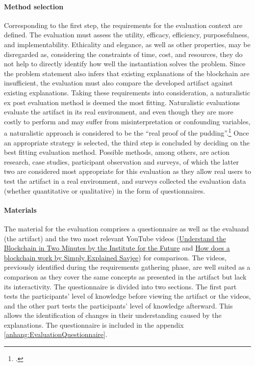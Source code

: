 \paragraph{Method selection} Corresponding to the first step, the requirements for the evaluation context are defined. The evaluation must assess the utility, efficacy, efficiency, purposefulness, and implementability. Ethicality and elegance, as well as other properties, may be disregarded as, considering the constraints of time, cost, and resources, they do not help to directly identify how well the instantiation solves the problem. Since the problem statement also infers that existing explanations of the blockchain are insufficient, the evaluation must also compare the developed artifact against existing explanations. Taking these requirements into consideration, a naturalistic ex post evaluation method is deemed the most fitting. Naturalistic evaluations evaluate the artifact in its real environment, and even though they are more costly to perform and may suffer from misinterpretation or confounding variables, a naturalistic approach is considered to be the \enquote{real proof of the pudding}.\footcites[Cf.][p.6, p.3 et seq]{Pries-HejeStrategiesDesignScience}[cf.][p.80]{PfeffersDesignScienceResearch2012} Once an appropriate strategy is selected, the third step is concluded by deciding on the best fitting evaluation method. Possible methods, among others, are action research, case studies, participant observation and surveys, of which the latter two are considered most appropriate for this evaluation as they allow real users to test the artifact in a real environment, and surveys collected the evaluation data (whether quantitative or qualitative) in the form of questionnaires. 

\paragraph{Materials} The material for the evaluation comprises a questionnaire as well as the evaluand (the artifact) and the two most relevant YouTube videos (\href{https://www.youtube.com/watch?v=r43LhSUUGTQ}{Understand the Blockchain in Two Minutes by the Institute for the Future} and \href{https://www.youtube.com/watch?v=SSo_EIwHSd4}{How does a blockchain work by Simply Explained Savjee}) for comparison. The videos, previously identified during the requirements gathering phase, are well suited as a comparison as they cover the same concepts as presented in the artifact but lack its interactivity. The questionnaire is divided into two sections. The first part tests the participants' level of knowledge before viewing the artifact or the videos, and the other part tests the participants' level of knowledge afterward. This allows the identification of changes in their understanding caused by the explanations. The questionnaire is included in the appendix \ref{anhang:EvaluationQuestionnaire}. 

